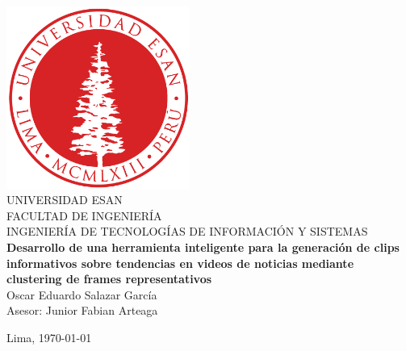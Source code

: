 \documentclass[12pt]{report}
\numberwithin{equation}{chapter} %
\begin{document}
	\begin{titlepage}
		\begin{center}
			\includegraphics[width=0.45\textwidth]{images_repo/esanlogomin}
			\vspace*{2cm} \\
			UNIVERSIDAD ESAN \vspace*{1ex} \\
			FACULTAD DE INGENIERÍA \vspace*{1ex} \\
			INGENIERÍA DE TECNOLOGÍAS DE INFORMACIÓN Y SISTEMAS\vspace*{8ex} \\
			\textbf{Desarrollo de una herramienta inteligente para la generación de clips informativos sobre tendencias en videos de noticias mediante clustering de frames representativos}
			\vspace*{8ex}\\	
			
			Oscar Eduardo Salazar García\\
			Asesor: Junior Fabian Arteaga		
			\vfill
			
			Lima, \today 
			
		\end{center}
	\end{titlepage}

	\renewcommand{\listfigurename}{Índice de Figuras}
	\renewcommand{\tablename}{Tabla}
	\renewcommand{\listtablename}{Índice de Tablas}
	
	\tableofcontents %


	\setcounter{secnumdepth}{3} %
	\setcounter{tocdepth}{3}    %

	\listoffigures %

	\listoftables  %
	
	
	

	
	
	
	
	

	

	\printbibliography[heading=bibintoc,title={BIBLIOGRAFÍA}]
	\appendix
	\renewcommand{\appendixname}{Anexos}
	\renewcommand{\appendixtocname}{Anexos}
	\renewcommand{\appendixpagename}{Anexos}
	\clearpage
	\addappheadtotoc
	\appendixpage
	
\end{document}
